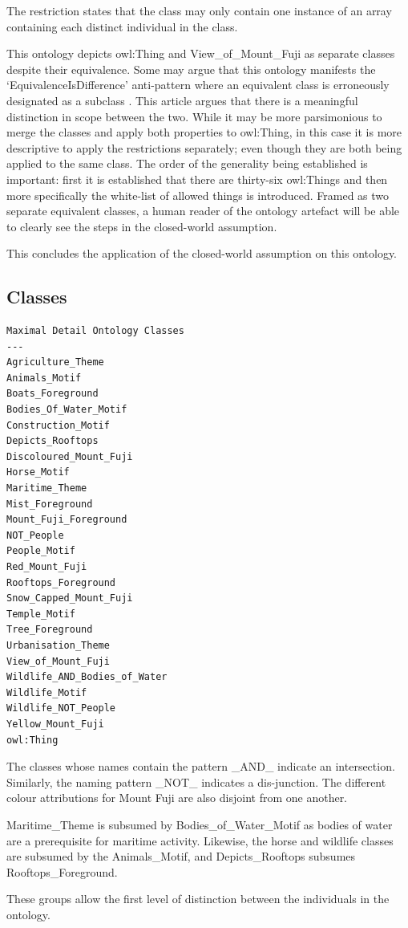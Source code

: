\documentclass[titlepage,a4paper,12pt,oneside]{book}
\begin{document}
The restriction states that the class may only contain one instance of an array containing each distinct individual in the class.\par
This ontology depicts owl:Thing and View\_of\_Mount\_Fuji as separate classes despite their equivalence.
Some may argue that this ontology manifests the `EquivalenceIsDifference' anti-pattern where an equivalent class is erroneously designated as a subclass \cite[2]{antipatterns2009}.
This article argues that there is a meaningful distinction in scope between the two.
While it may be more parsimonious to merge the classes and apply both properties to owl:Thing, in this case it is more descriptive to apply the restrictions separately; even though they are both being applied to the same class.
The order of the generality being established is important: first it is established that there are thirty-six owl:Things and then more specifically the white-list of allowed things is introduced.
Framed as two separate equivalent classes, a human reader of the ontology artefact will be able to clearly see the steps in the closed-world assumption.\par
This concludes the application of the closed-world assumption on this ontology.
\subsection{Classes}
\begin{lstlisting}
Maximal Detail Ontology Classes
---
Agriculture_Theme
Animals_Motif
Boats_Foreground
Bodies_Of_Water_Motif
Construction_Motif
Depicts_Rooftops
Discoloured_Mount_Fuji
Horse_Motif
Maritime_Theme
Mist_Foreground
Mount_Fuji_Foreground
NOT_People
People_Motif
Red_Mount_Fuji
Rooftops_Foreground
Snow_Capped_Mount_Fuji
Temple_Motif
Tree_Foreground
Urbanisation_Theme
View_of_Mount_Fuji
Wildlife_AND_Bodies_of_Water
Wildlife_Motif
Wildlife_NOT_People
Yellow_Mount_Fuji
owl:Thing
\end{lstlisting}
The classes whose names contain the pattern \_AND\_ indicate an intersection.
Similarly, the naming pattern \_NOT\_ indicates a dis-junction.
The different colour attributions for Mount Fuji are also disjoint from one another.\par
Maritime\_Theme is subsumed by Bodies\_of\_Water\_Motif as bodies of water are a prerequisite for maritime activity.
Likewise, the horse and wildlife classes are subsumed by the Animals\_Motif, and Depicts\_Rooftops subsumes Rooftops\_Foreground.\par
These groups allow the first level of distinction between the individuals in the ontology.
\end{document}
